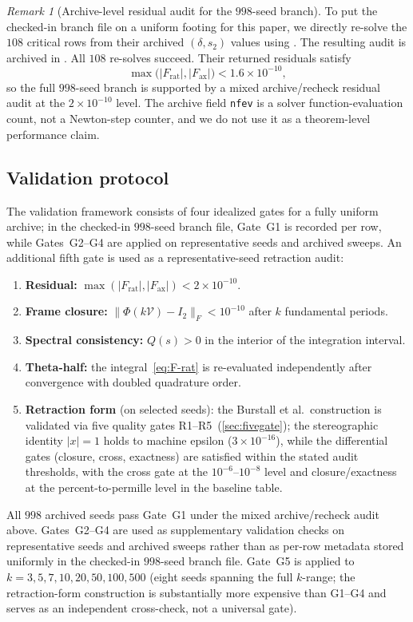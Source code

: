 \documentclass[11pt,a4paper]{article}
\theoremstyle{plain}
\theoremstyle{definition}
\theoremstyle{remark}
\newtheorem{remark}[theorem]{Remark}
\newcommand{\abs}[1]{\lvert #1 \rvert}
\newcommand{\norm}[1]{\lVert #1 \rVert}
\begin{document}
\begin{remark}[Archive-level residual audit for the $998$-seed branch]
  To put the checked-in branch file on a uniform footing for this paper,
  we directly re-solve the $108$ critical rows from their archived
  $(\delta,s_2)$ values using
  .  The resulting audit
  is archived in
  .
  All $108$ re-solves succeed.  Their returned residuals satisfy
  \[
    \max\bigl(\abs{F_{\mathrm{rat}}},\abs{F_{\mathrm{ax}}}\bigr)
    < 1.6\times 10^{-10},
  \]
  so the full $998$-seed branch is supported by a mixed archive/recheck
  residual audit at the $2\times 10^{-10}$ level.  The archive field
  \texttt{nfev} is a solver function-evaluation count, not a Newton-step
  counter, and we do not use it as a theorem-level performance claim.
\end{remark}

\subsection{Validation protocol}\label{sec:validation}
The validation framework consists of four idealized gates for a fully
uniform archive; in the checked-in $998$-seed branch file, Gate~G1 is
recorded per row, while Gates~G2--G4 are applied on representative seeds
and archived sweeps.  An additional fifth gate is used as a
representative-seed retraction audit:
\begin{enumerate}[nosep,label=\textbf{G\arabic*.}]
\item \textbf{Residual:}
  $\max(\abs{F_{\mathrm{rat}}}, \abs{F_{\mathrm{ax}}}) < 2\times 10^{-10}$.
\item \textbf{Frame closure:}
  $\norm{\Phi(k\mathcal{V}) - I_2}_F < 10^{-10}$
  after $k$ fundamental periods.
\item \textbf{Spectral consistency:}
  $Q(s) > 0$ in the interior of the integration interval.
\item \textbf{Theta-half:}
  the integral~\eqref{eq:F-rat} is re-evaluated independently after
  convergence with doubled quadrature order.
\item \textbf{Retraction form} (on selected seeds):
  the Burstall et al.\ construction is validated via five quality
  gates R1--R5~(\cref{sec:fivegate}); the stereographic identity
  $\abs{x}=1$ holds to machine epsilon ($3 \times 10^{-16}$),
  while the differential gates (closure, cross, exactness) are
  satisfied within the stated audit thresholds, with the cross gate at
  the $10^{-6}$--$10^{-8}$ level and closure/exactness at the
  percent-to-permille level in the baseline table.
\end{enumerate}
All $998$ archived seeds pass Gate~G1 under the mixed archive/recheck
audit above.  Gates~G2--G4 are used as supplementary validation checks on
representative seeds and archived sweeps rather than as per-row metadata
stored uniformly in the checked-in $998$-seed branch file.
Gate~G5 is applied to
$k = 3, 5, 7, 10, 20, 50, 100, 500$
(eight seeds spanning the full $k$-range; the retraction-form
construction is substantially more expensive than G1--G4
and serves as an independent cross-check, not a universal gate).
\end{document}
